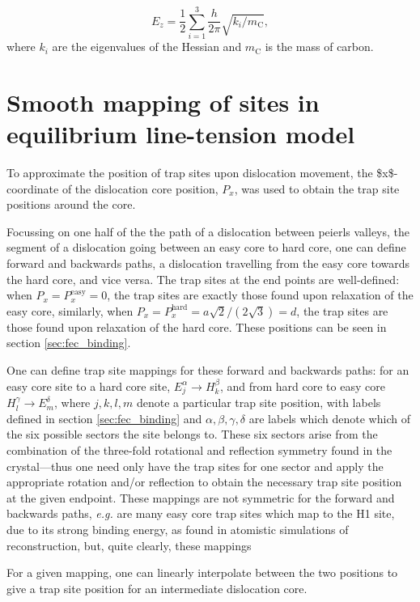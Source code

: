 \documentclass[a4paper,12pt,oneside,print,numbered,index,PageStyleIII]{PhDThesisPSnPDF}
\begin{document}
\begin{appendices}
\[ E_z = \frac{1}{2} \sum_{i=1}^3 \frac{h}{2\pi} \sqrt{ k_i /
  m_{\text{C}} },  \]
where \(k_i\) are the eigenvalues of the Hessian and \(m_\text{C}\) is
the mass of carbon.

\chapter{Smooth mapping of sites in equilibrium line-tension model}
\label{sec:org04609de}
\label{sec:smoothsitemapping}

To approximate the position of trap sites upon dislocation movement, the
\$x\$-coordinate of the dislocation core position, \(P_x\), was used to obtain the trap
site positions around the core.

Focussing on one half of the the path of a dislocation between peierls
valleys, the segment of a dislocation going between an easy core to hard
core, one can define forward and backwards paths, a dislocation travelling
from the easy core towards the hard core, and vice versa. The trap sites at
the end points are well-defined: when \(P_x = P_x^{\text{easy}} = 0\), the trap
sites are exactly those found upon relaxation of the easy core, similarly,
when \(P_x = P_x^{\text{hard}} = a\sqrt{2} / (2\sqrt{3}) = d\), the trap sites are
those found upon relaxation of the hard core. These positions can be seen in
section \ref{sec:fec_binding}.

One can define trap site mappings for these forward and backwards paths: for an easy
core site to a hard core site, \(E_j^{\alpha} \rightarrow H_k^{\beta}\), and
from hard core to easy core \(H_l^{\gamma} \rightarrow E_m^{\delta}\), where
\(j,k,l,m\) denote a particular trap site position, with labels defined in section \ref{sec:fec_binding} and
\(\alpha,\beta,\gamma,\delta\) are labels which denote which of the six possible sectors the
site belongs to. These six sectors arise from the combination of the
three-fold rotational and reflection symmetry found in the crystal---thus one
need only have the trap sites for one sector and apply the appropriate rotation and/or
reflection to obtain the necessary trap site position at the given endpoint. These mappings are not
symmetric for the forward and backwards paths, \emph{e.g.} are many easy core trap
sites which map to the H1 site, due to its strong binding energy, as found in
atomistic simulations of reconstruction, but, quite clearly, these mappings


For a given mapping, one can linearly interpolate between the two positions to give a trap site position for an
intermediate dislocation core.


\end{appendices}
\end{document}
